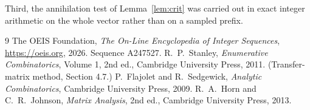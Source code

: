 \documentclass[11pt,a4paper]{article}
\theoremstyle{plain}
\theoremstyle{definition}
\begin{document}
Third, the annihilation test of Lemma~\ref{lem:crit} was carried out in exact integer
arithmetic on the whole vector rather than on a sampled prefix.

\begin{thebibliography}{9}
 The OEIS Foundation, \emph{The On-Line Encyclopedia of Integer
Sequences}, \url{https://oeis.org}, 2026. Sequence A247527.
 R.~P.~Stanley, \emph{Enumerative Combinatorics}, Volume 1, 2nd ed.,
Cambridge University Press, 2011. (Transfer-matrix method, Section 4.7.)
 P.~Flajolet and R.~Sedgewick, \emph{Analytic Combinatorics}, Cambridge
University Press, 2009.
 R.~A.~Horn and C.~R.~Johnson, \emph{Matrix Analysis}, 2nd ed., Cambridge
University Press, 2013.
\end{thebibliography}
\end{document}
